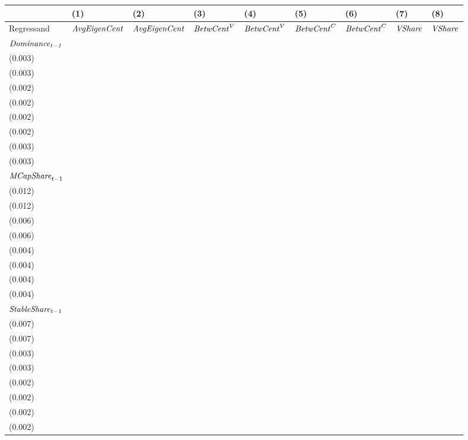 \begin{tabular}{lllllllll}
\toprule
{} &                                  (1) &                                 (2) &                                  (3) &                                  (4) &                                  (5) &                                  (6) &                                 (7) &                                 (8) \\
\midrule
Regressand                   &                 ${\it AvgEigenCent}$ &                ${\it AvgEigenCent}$ &                   ${\it BetwCent}^V$ &                   ${\it BetwCent}^V$ &                   ${\it BetwCent}^C$ &                   ${\it BetwCent}^C$ &                      ${\it VShare}$ &                      ${\it VShare}$ \\
$\it Dominance_{t-1}$        &   \makecell{$0.828^{***}$ \\(0.003)} &  \makecell{$0.829^{***}$ \\(0.003)} &   \makecell{$0.963^{***}$ \\(0.002)} &   \makecell{$0.963^{***}$ \\(0.002)} &   \makecell{$0.957^{***}$ \\(0.002)} &   \makecell{$0.957^{***}$ \\(0.002)} &  \makecell{$0.896^{***}$ \\(0.003)} &  \makecell{$0.896^{***}$ \\(0.003)} \\
${{\it MCapShare}}_{t-1}$    &      \makecell{$0.019^{}$ \\(0.012)} &     \makecell{$0.019^{}$ \\(0.012)} &   \makecell{$0.061^{***}$ \\(0.006)} &   \makecell{$0.061^{***}$ \\(0.006)} &   \makecell{$0.048^{***}$ \\(0.004)} &   \makecell{$0.048^{***}$ \\(0.004)} &  \makecell{$0.047^{***}$ \\(0.004)} &  \makecell{$0.047^{***}$ \\(0.004)} \\
${{\it StableShare}}_{t-1}$  &   \makecell{$0.091^{***}$ \\(0.007)} &  \makecell{$0.091^{***}$ \\(0.007)} &  \makecell{$-0.008^{***}$ \\(0.003)} &  \makecell{$-0.008^{***}$ \\(0.003)} &  \makecell{$-0.007^{***}$ \\(0.002)} &  \makecell{$-0.007^{***}$ \\(0.002)} &  \makecell{$0.023^{***}$ \\(0.002)} &  \makecell{$0.023^{***}$ \\(0.002)} \\

\end{tabular}
